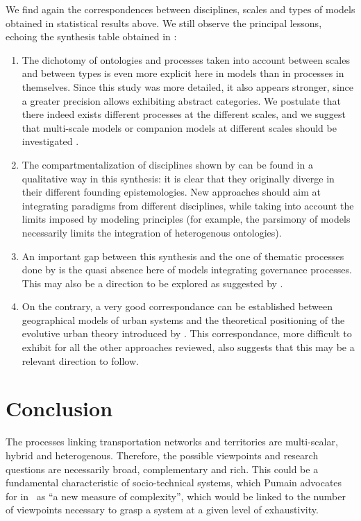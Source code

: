 \documentclass[10pt]{article}
\begin{document}
We find again the correspondences between disciplines, scales and types of models obtained in statistical results above. We still observe the principal lessons, echoing the synthesis table obtained in \cite{raimbault2018caracterisation}:
\begin{enumerate}
	\item The dichotomy of ontologies and processes taken into account between scales and between types is even more explicit here in models than in processes in themselves. Since this study was more detailed, it also appears stronger, since a greater precision allows exhibiting abstract categories. We postulate that there indeed exists different processes at the different scales, and we suggest that multi-scale models or companion models at different scales should be investigated \cite{rozenblat2018conclusion}.
	\item The compartmentalization of disciplines shown by \cite{raimbault2017models} can be found in a qualitative way in this synthesis: it is clear that they originally diverge in their different founding epistemologies. New approaches should aim at integrating paradigms from different disciplines, while taking into account the limits imposed by modeling principles (for example, the parsimony of models necessarily limits the integration of heterogenous ontologies).
	\item An important gap between this synthesis and the one of thematic processes done by \cite{raimbault2018caracterisation} is the quasi absence here of models integrating governance processes. This may also be a direction to be explored as suggested by \cite{le2015modeling}.
	\item On the contrary, a very good correspondance can be established between geographical models of urban systems and the theoretical positioning of the evolutive urban theory introduced by \cite{pumain2018evolutionary}. This correspondance, more difficult to exhibit for all the other approaches reviewed, also suggests that this may be a relevant direction to follow.
\end{enumerate}


\section{Conclusion}

The processes linking transportation networks and territories are multi-scalar, hybrid and heterogenous. Therefore, the possible viewpoints and research questions are necessarily broad, complementary and rich. This could be a fundamental characteristic of socio-technical systems, which Pumain advocates for in~\cite{pumain2005cumulativite} as ``a new measure of complexity'', which would be linked to the number of viewpoints necessary to grasp a system at a given level of exhaustivity.
\end{document}
